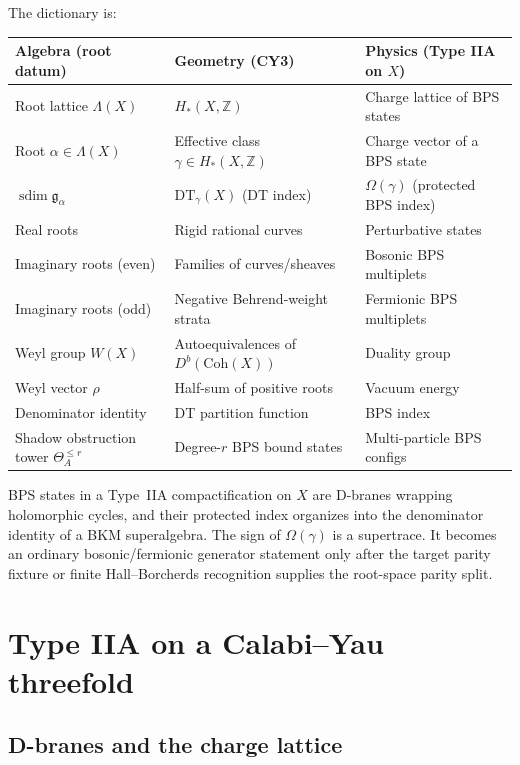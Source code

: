 \documentclass[11pt]{article}
\theoremstyle{definition}
\newcommand{\Coh}{\mathrm{Coh}}
\newcommand{\DT}{\mathrm{DT}}
\newcommand{\bZ}{\mathbb{Z}}
\begin{document}
The dictionary is:
\begin{center}
\renewcommand{\arraystretch}{1.3}
\begin{tabular}{p{3.8cm}p{4.2cm}p{4.5cm}}
\textbf{Algebra (root datum)} & \textbf{Geometry (CY3)} &
 \textbf{Physics (Type IIA on $X$)} \\
\hline
Root lattice $\Lambda(X)$ & $H_*(X, \bZ)$ & Charge lattice of BPS
 states \\
Root $\alpha \in \Lambda(X)$ & Effective class $\gamma \in H_*(X,\bZ)$
 & Charge vector of a BPS state \\
$\operatorname{sdim}\mathfrak g_\alpha$ & $\DT_\gamma(X)$ (DT index) &
 $\Omega(\gamma)$ (protected BPS index) \\
Real roots & Rigid rational curves & Perturbative states \\
Imaginary roots (even) & Families of curves/sheaves &
 Bosonic BPS multiplets \\
Imaginary roots (odd) & Negative Behrend-weight strata &
 Fermionic BPS multiplets \\
Weyl group $W(X)$ & Autoequivalences of $D^b(\Coh(X))$ &
 Duality group \\
Weyl vector $\rho$ & Half-sum of positive roots & Vacuum energy \\
Denominator identity & DT partition function & BPS index \\
Shadow obstruction tower $\Theta^{\leq r}_A$ & Degree-$r$ BPS bound states &
 Multi-particle BPS configs
\end{tabular}
\end{center}

BPS states in a Type~IIA compactification on $X$ are D-branes wrapping holomorphic cycles, and their protected index organizes into the denominator identity of a BKM superalgebra. The sign of $\Omega(\gamma)$ is a supertrace. It becomes an ordinary bosonic/fermionic generator statement only after the target parity fixture or finite Hall--Borcherds recognition supplies the root-space parity split.

\section{Type IIA on a Calabi--Yau threefold}
\label{sec:type-iia}

\subsection{D-branes and the charge lattice}
\end{document}
